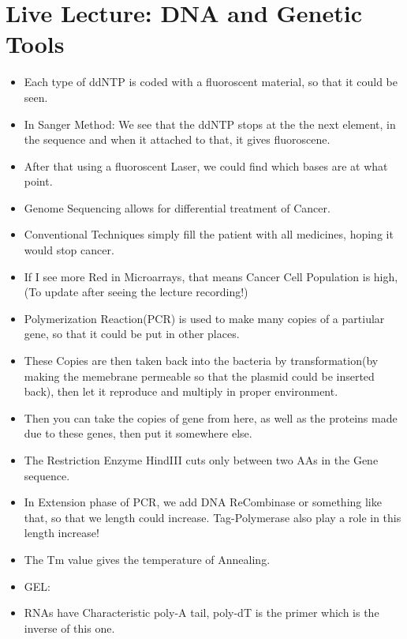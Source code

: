\documentclass{article}
\begin{document}
\section{Live Lecture: DNA and Genetic Tools}
\begin{itemize}
  \item Each type of ddNTP is coded with a fluoroscent material, so that it could be seen.
  \item In Sanger Method: We see that the ddNTP stops at the the next element, in the sequence and when it attached to that, it gives fluoroscene.
  \item After that using a fluoroscent Laser, we could find which bases are at what point.
  \item Genome Sequencing allows for differential treatment of Cancer.
  \item Conventional Techniques simply fill the patient with all medicines, hoping it would stop cancer.
  \item If I see more Red in Microarrays, that means Cancer Cell Population is high,  (To update after seeing the lecture recording!)
  \item Polymerization Reaction(PCR) is used to make many copies of a partiular gene, so that it could be put in other places.
  \item These Copies are then taken back into the bacteria by transformation(by making the memebrane permeable so that the plasmid could be inserted back), then let it reproduce and multiply in proper environment.
  \item Then you can take the copies of gene from here, as well as the proteins made due to these genes, then put it somewhere else.
  \item The Restriction Enzyme HindIII cuts only between two AAs in the Gene sequence.
  \item In Extension phase of PCR, we add DNA ReCombinase or something like that, so that we length could increase. Tag-Polymerase also play a role in this length increase!
  \item The Tm value gives the temperature of Annealing.
  \item GEL:
  \item RNAs have Characteristic poly-A tail, poly-dT is the primer which is the inverse of this one.
\end{itemize}
\end{document}
